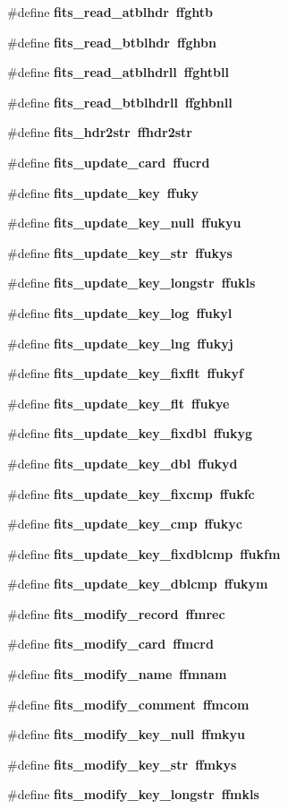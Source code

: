 \begin{CompactItemize}
\item 
\#define \bf{fits\_\-read\_\-atblhdr}~ffghtb
\item 
\#define \bf{fits\_\-read\_\-btblhdr}~ffghbn
\item 
\#define \bf{fits\_\-read\_\-atblhdrll}~ffghtbll
\item 
\#define \bf{fits\_\-read\_\-btblhdrll}~ffghbnll
\item 
\#define \bf{fits\_\-hdr2str}~ffhdr2str
\item 
\#define \bf{fits\_\-update\_\-card}~ffucrd
\item 
\#define \bf{fits\_\-update\_\-key}~ffuky
\item 
\#define \bf{fits\_\-update\_\-key\_\-null}~ffukyu
\item 
\#define \bf{fits\_\-update\_\-key\_\-str}~ffukys
\item 
\#define \bf{fits\_\-update\_\-key\_\-longstr}~ffukls
\item 
\#define \bf{fits\_\-update\_\-key\_\-log}~ffukyl
\item 
\#define \bf{fits\_\-update\_\-key\_\-lng}~ffukyj
\item 
\#define \bf{fits\_\-update\_\-key\_\-fixflt}~ffukyf
\item 
\#define \bf{fits\_\-update\_\-key\_\-flt}~ffukye
\item 
\#define \bf{fits\_\-update\_\-key\_\-fixdbl}~ffukyg
\item 
\#define \bf{fits\_\-update\_\-key\_\-dbl}~ffukyd
\item 
\#define \bf{fits\_\-update\_\-key\_\-fixcmp}~ffukfc
\item 
\#define \bf{fits\_\-update\_\-key\_\-cmp}~ffukyc
\item 
\#define \bf{fits\_\-update\_\-key\_\-fixdblcmp}~ffukfm
\item 
\#define \bf{fits\_\-update\_\-key\_\-dblcmp}~ffukym
\item 
\#define \bf{fits\_\-modify\_\-record}~ffmrec
\item 
\#define \bf{fits\_\-modify\_\-card}~ffmcrd
\item 
\#define \bf{fits\_\-modify\_\-name}~ffmnam
\item 
\#define \bf{fits\_\-modify\_\-comment}~ffmcom
\item 
\#define \bf{fits\_\-modify\_\-key\_\-null}~ffmkyu
\item 
\#define \bf{fits\_\-modify\_\-key\_\-str}~ffmkys
\item 
\#define \bf{fits\_\-modify\_\-key\_\-longstr}~ffmkls
\item 

\end{CompactItemize}
